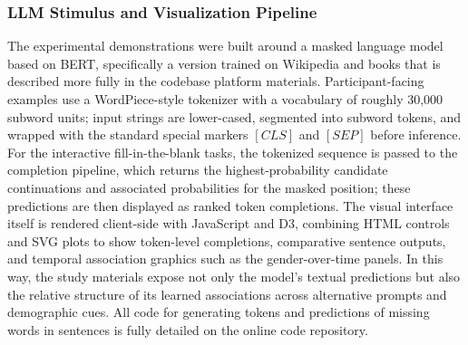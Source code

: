 \subsubsection{LLM Stimulus and Visualization Pipeline}
The experimental demonstrations were built around a masked language model based on BERT, specifically a version trained on Wikipedia and books that is described more fully in the codebase platform materials. Participant-facing examples use a WordPiece-style tokenizer with a vocabulary of roughly 30{,}000 subword units; input strings are lower-cased, segmented into subword tokens, and wrapped with the standard special markers $[CLS]$ and $[SEP]$ before inference. For the interactive fill-in-the-blank tasks, the tokenized sequence is passed to the completion pipeline, which returns the highest-probability candidate continuations and associated probabilities for the masked position; these predictions are then displayed as ranked token completions. The visual interface itself is rendered client-side with JavaScript and D3, combining HTML controls and SVG plots to show token-level completions, comparative sentence outputs, and temporal association graphics such as the gender-over-time panels. In this way, the study materials expose not only the model's textual predictions but also the relative structure of its learned associations across alternative prompts and demographic cues. All code for generating tokens and predictions of missing words in sentences is fully detailed on the online code repository. 

